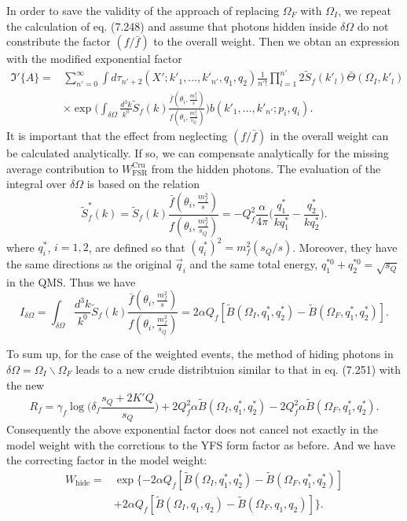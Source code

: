 In order to save the validity of the approach of replacing $\Omega_F$ with $\Omega_I$, we repeat the calculation of eq. (7.248) and assume that photons hidden inside $\delta\Omega$ do not constribute the factor $(f/\bar{f})$ to the overall weight. Then we obtan an expression with the modified exponential factor
\begin{align}
\mathfrak{I}'\{A\}=&\sum_{n'=0}^{\infty}\int d\tau_{n'+2}(X';k'_1,
\ldots,k'_{n'},q_1,q_2)\frac{1}{n'!}\prod_{l=1}^{n'}2\widetilde{S}_f(k'_l)\bar{\Theta}(\Omega_I,k'_l)\nonumber\\
&\times\exp\biggl( \int_{\delta\Omega}\frac{d^3 k}{k^0}\widetilde{S}_f(k)\frac{\bar{f}\left(\theta_i,\frac{m_f^2}{s}\right)}{f\left(\theta_i,\frac{m_f^2}{s_Q}\right)} \biggr)b(k'_1,\ldots,k'_{n'};p_i,q_i).
\end{align}
It is important that the effect from neglecting $(f/\bar{f})$ in the overall weight can be calculated analytically. If so, we can compensate analytically for the missing average contribution to $W^\text{Cru}_\text{FSR}$ from the hidden photons. The evaluation of the integral over $\delta\Omega$ is based on the relation 
\begin{equation*}
\widetilde{S}^\ast_f(k)=\widetilde{S}_f(k)\frac{\bar{f}\left(\theta_i,\frac{m_f^2}{s}\right)}{f\left(\theta_i,\frac{m_f^2}{s_Q}\right)}=-Q^2_f\frac{\alpha}{4\pi}\biggl(\frac{q^\ast_1}{kq^\ast_1}-\frac{q^\ast_2}{kq^\ast_2}\biggr).
\end{equation*}
where $q^\ast_i$, $i=1,2$, are defined so that $(q^\ast_i)^2=m^2_f(s_Q/s)$. Moreover, they have the same directions as the original $\vec{q}_i$ and the same total energy, $q^{\ast0}_1+q^{\ast0}_2=\sqrt{s_Q}$ in the QMS. Thus we have
\begin{equation}
I_{\delta\Omega}=\int_{\delta\Omega}\frac{d^3k}{k^0}\widetilde{S}_f(k)\frac{\bar{f}\left(\theta_i,\frac{m_f^2}{s}\right)}{f\left(\theta_i,\frac{m_f^2}{s_Q}\right)}=2\alpha Q_f[\widetilde{B}(\Omega_I,q^\ast_1,q^\ast_2)-\widetilde{B}(\Omega_F,q^\ast_1,q^\ast_2)].
\end{equation}

To sum up, for the case of the weighted events, the method of hiding photons in $\delta\Omega=\Omega_I\backslash\Omega_F$ leads to a new crude distribtuion similar to that in eq. (7.251) with the new
\begin{equation}
R_f=\gamma_f\log\biggl(\delta_f\frac{s_Q+2K'Q}{s_Q}\biggr)+2Q^2_f\alpha\widetilde{B}(\Omega_I,q^\ast_1,q^\ast_2)-2Q^2_f\alpha\widetilde{B}(\Omega_F,q^\ast_1,q^\ast_2).
\end{equation}
Consequently the above exponential factor does not cancel not exactly in the model weight with the corrctions to the YFS form factor as before. And we have the correcting factor in the model weight:
\begin{align}
W_\text{hide}=&\exp\{ -2\alpha Q_f[\widetilde{B}(\Omega_I,q^\ast_1,q^\ast_2)-\widetilde{B}(\Omega_F,q^\ast_1,q^\ast_2)]\nonumber\\
&+2\alpha Q_f[\widetilde{B}(\Omega_I,q_1,q_2)-\widetilde{B}(\Omega_F,q_1,q_2)] \}.
\end{align}

